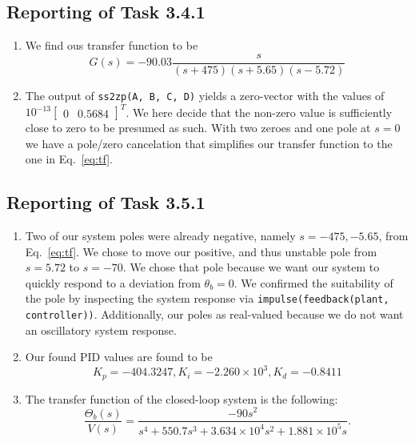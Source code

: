 \documentclass[11pt]{article} %
\begin{document}
\subsection*{Reporting of Task 3.4.1}
\begin{enumerate}
\item %
We find ous transfer function to be
\begin{equation}\label{eq:tf}
  G(s) = -90.03\frac{s}{(s + 475)(s + 5.65)(s - 5.72)}
\end{equation}

\item %
The output of \texttt{ss2zp(A, B, C, D)} yields a zero-vector with the
values of $10^{-13}\begin{bmatrix} 0 & 0.5684 \end{bmatrix}^T$. We here decide that the non-zero
value is sufficiently close to zero to be presumed as such. With two
zeroes and one pole at $s = 0$ we have a pole/zero cancelation that
simplifies our transfer function to the one in Eq.~\eqref{eq:tf}.
\end{enumerate}

\subsection*{Reporting of Task 3.5.1}
\begin{enumerate}
\item %
  Two of our system poles were already negative, namely $s = -475,
  -5.65$, from Eq.~\eqref{eq:tf}. We chose to move our positive, and
  thus unstable pole from $s = 5.72$ to $s = -70$. We chose that pole
  because we want our system to quickly respond to a deviation from
  $\theta_b = 0$. We confirmed the suitability of the pole by
  inspecting the system response via \texttt{impulse(feedback(plant, controller))}.
  Additionally, our poles as real-valued because we do not want an oscillatory system response.
\item %
  Our found \ac{PID} values are found to be
  \begin{equation}\label{eq:pid}
  K_p = -404.3247, K_i = -2.260 \times 10^3, K_d = -0.8411
  \end{equation}
\item %
  The transfer function of the closed-loop system is the following:
  $$
  \frac{\Theta_b(s)}{V(s)} =
  \frac{-90s^2}{
    s^4
    + 550.7s^3
    + 3.634 \times 10^4 s^2
    + 1.881 \times 10^5 s
  }.
  $$
\end{enumerate}
\end{document}
